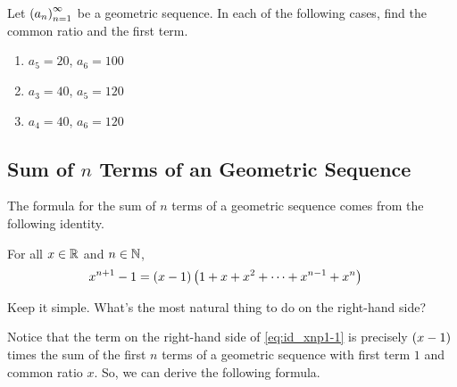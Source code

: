 \begin{boxexercise}
    Let $\left( a_n \right)_{n=1}^{\infty}$ be a geometric sequence. In each of the following cases, find the common ratio and the first term.
    \begin{enumerate}
        \item $a_5 = 20$, $a_6 = 100$
        \item $a_3 = 40$, $a_5 = 120$
        \item $a_4 = 40$, $a_6 = 120$
    \end{enumerate}
\end{boxexercise}

\subsection{Sum of $n$ Terms of an Geometric Sequence}

The formula for the sum of $n$ terms of a geometric sequence comes from the following identity.

\begin{boxexercise}
    For all $x \in \mathbb{R}$ and $n \in \mathbb{N}$,
    \begin{align}
        x^{n + 1} - 1 &= \left( x - 1 \right)\left( 1 + x + x^2 + \cdots + x^{n-1} + x^n \right) \label{eq:id_xnp1-1}
    \end{align}
    \begin{hint}
        Keep it simple. What's the most natural thing to do on the right-hand side?
    \end{hint}
\end{boxexercise}

Notice that the term on the right-hand side of \eqref{eq:id_xnp1-1} is precisely $\left( x - 1 \right)$ times the sum of the first $n$ terms of a geometric sequence with first term $1$ and common ratio $x$. So, we can derive the following formula.

